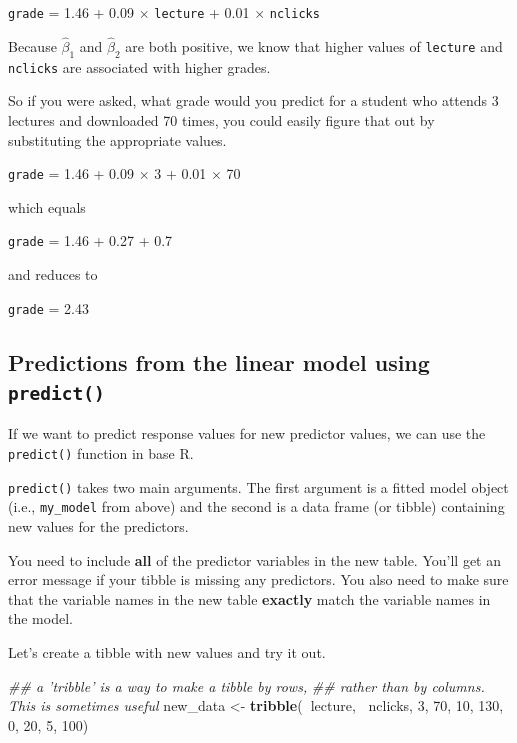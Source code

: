 \documentclass[]{book}
\newenvironment{Shaded}{\begin{snugshade}}{\end{snugshade}}
\newcommand{\CommentTok}[1]{\textcolor[rgb]{0.56,0.35,0.01}{\textit{#1}}}
\newcommand{\DecValTok}[1]{\textcolor[rgb]{0.00,0.00,0.81}{#1}}
\newcommand{\KeywordTok}[1]{\textcolor[rgb]{0.13,0.29,0.53}{\textbf{#1}}}
\newcommand{\NormalTok}[1]{#1}
\newcommand{\OperatorTok}[1]{\textcolor[rgb]{0.81,0.36,0.00}{\textbf{#1}}}
\newcommand{\StringTok}[1]{\textcolor[rgb]{0.31,0.60,0.02}{#1}}
\begin{document}
\texttt{grade} = 1.46 + 0.09 \(\times\) \texttt{lecture} + 0.01 \(\times\) \texttt{nclicks}

Because \(\hat{\beta}_1\) and \(\hat{\beta}_2\) are both positive, we know that higher values of \texttt{lecture} and \texttt{nclicks} are associated with higher grades.

So if you were asked, what grade would you predict for a student who attends 3 lectures and downloaded 70 times, you could easily figure that out by substituting the appropriate values.

\texttt{grade} = 1.46 + 0.09 \(\times\) 3 + 0.01 \(\times\) 70

which equals

\texttt{grade} = 1.46 + 0.27 + 0.7

and reduces to

\texttt{grade} = 2.43

\hypertarget{predictions-from-the-linear-model-using-predict}{%
\subsection{\texorpdfstring{Predictions from the linear model using \texttt{predict()}}{Predictions from the linear model using predict()}}\label{predictions-from-the-linear-model-using-predict}}

If we want to predict response values for new predictor values, we can use the \texttt{predict()} function in base R.

\texttt{predict()} takes two main arguments. The first argument is a fitted model object (i.e., \texttt{my\_model} from above) and the second is a data frame (or tibble) containing new values for the predictors.

You need to include \textbf{all} of the predictor variables in the new table. You'll get an error message if your tibble is missing any predictors. You also need to make sure that the variable names in the new table \textbf{exactly} match the variable names in the model.

Let's create a tibble with new values and try it out.

\begin{Shaded}
\begin{Highlighting}[]
\CommentTok{## a 'tribble' is a way to make a tibble by rows,}
\CommentTok{## rather than by columns. This is sometimes useful}
\NormalTok{new_data <-}\StringTok{ }\KeywordTok{tribble}\NormalTok{(}\OperatorTok{~}\NormalTok{lecture, }\OperatorTok{~}\NormalTok{nclicks,}
                    \DecValTok{3}\NormalTok{, }\DecValTok{70}\NormalTok{,}
                    \DecValTok{10}\NormalTok{, }\DecValTok{130}\NormalTok{,}
                    \DecValTok{0}\NormalTok{, }\DecValTok{20}\NormalTok{,}
                    \DecValTok{5}\NormalTok{, }\DecValTok{100}\NormalTok{)}
\end{Highlighting}
\end{Shaded}
\end{document}

